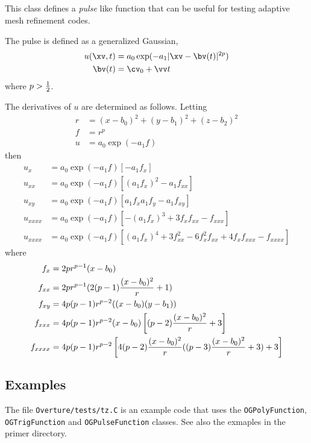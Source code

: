 \vfill\eject 
\subsection{}
 
This class defines a {\it pulse} like function that can be useful for testing
adaptive mesh refinement codes.

The pulse is defined as a generalized Gaussian,
\begin{align*}
  u(\xv,t) &=  a_0 \exp( - a_1 | \xv-\bv(t) |^{2p} )  \\
  \bv(t) &= \cv_0 + \vv t
\end{align*}
where $p>{1\over 2}$.

The derivatives of $u$ are determined as follows. 
Letting
\begin{align*}
   r &= (x-b_0)^2 + (y-b_1)^2 + (z-b_2)^2 \\
   f &= r^p \\
   u &= a_0 \exp(-a_1 f )
\end{align*}
then
\begin{align*}
   u_x &= a_0 \exp(-a_1 f )\left[ -a_1 f_x \right] \\
   u_{xx} &= a_0 \exp(-a_1 f )\left[ (a_1 f_x)^2 - a_1 f_{xx} \right] \\
   u_{xy} &= a_0 \exp(-a_1 f )\left[ a_1 f_x a_1 f_y - a_1 f_{xy} \right] \\
   u_{xxxx} &= a_0 \exp(-a_1 f )\left[ -(a_1 f_x)^3 + 3 f_x f_{xx} - f_{xxx}\right] \\
   u_{xxxx} &= a_0 \exp(-a_1 f )\left[ (a_1 f_x)^4 + 3 f_{xx}^2 -6 f_x^2 f_{xx} +4 f_x f_{xxx} -f_{xxxx}\right] 
\end{align*}
where
\begin{align*}
  f_x & = 2 p r^{p-1} (x-b_0) \\
  f_{xx} &= 2 p r^{p-1} ( 2(p-1) {(x-b_0)^2\over r} + 1 ) \\
  f_{xy} &= 4 p(p-1) r^{p-2} ( (x-b_0)(y-b_1) ) \\
  f_{xxx} &= 4 p (p-1) r^{p-2} (x-b_0)\left[ (p-2) {(x-b_0)^2\over r} + 3  \right] \\
  f_{xxxx} &= 4 p (p-1) r^{p-2}\left[ 4(p-2){(x-b_0)^2\over r}( (p-3){(x-b_0)^2\over r}+3) + 3 \right]
\end{align*}



\subsection{Examples}

The file {\tt Overture/tests/tz.C} is an example code that uses the {\tt OGPolyFunction},
{\tt OGTrigFunction} and {\tt OGPulseFunction} classes. See also the exmaples in the
primer directory.
